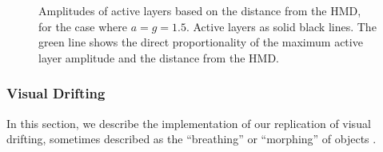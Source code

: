 \begin{figure}[H]
    \centering
    \ifgraphics
        {
            \def\constepsilon{0.001}
            \def\constymin{-13}
            \def\constymax{7}
            \def\constm{4}
            \def\consta{1.5}
            \def\fnf(#1){(ln(#1) / ln(\consta))}
            \def\fnfinv(#1){((\consta)^(#1))}
            \def\fnoctave(#1){(floor(\fnf(#1)))}

        }
    \fi
    \caption{Amplitudes of active layers based on the distance from the \ac{HMD}, for the case where $a = g = 1.5$. Active layers as solid black lines. The green line shows the direct proportionality of the maximum active layer amplitude and the distance from the \ac{HMD}.}\label{fig:noise-amplitudes}
\end{figure}

\subsubsection{Visual Drifting}

In this section, we describe the implementation of our replication of visual drifting, sometimes described as the ``breathing'' or ``morphing'' of objects \autocites{diaz2010sacred}{kleinman1977comparison}.

